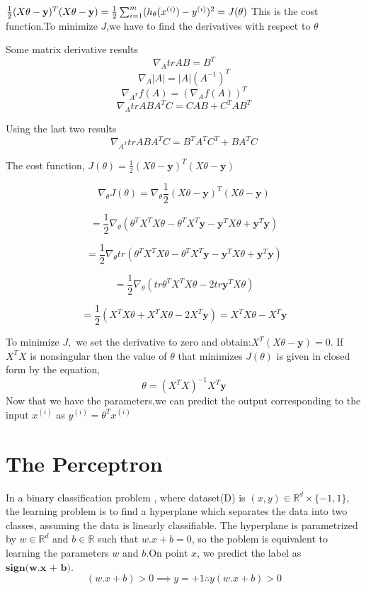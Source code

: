\documentclass[12pt]{article}
\begin{document}
 
 $\frac{1}{2}(X\theta-\textbf y)^{T}(X\theta-\textbf y)=\frac{1}{2} \sum_{i=1}^{m}(h_{\theta}(x^{(i)})-y^{(i)})^{2}=J(\theta)$ This is the cost function.To minimize $J$,we have to find the derivatives with respect to $\theta$
 
 
 
 
Some matrix derivative results
 $$\nabla_{A}tr AB = B^{T}$$ 
 $$\nabla_{A}\vert A\vert=\vert A\vert(A^{-1})^{T}$$ 
 $$\nabla_{A^{T}}f(A)= (\nabla_{A}f(A))^{T}$$ 
 $$\nabla_{A}trABA^{T}C=CAB+C^{T}AB^{T}$$
 
 
 Using the last two results 
 $$\nabla_{A^{T}}trABA^{T}C=B^{T}A^{T}C^{T}+BA^{T}C$$
 
 
 
 The cost function,  $J(\theta)=\frac{1}{2}(X\theta-\textbf{y})^{T}(X\theta-\textbf{y})$
 
 
$$ \nabla_{\theta} J(\theta)  =\nabla_{\theta}\frac{1}{2}(X\theta-\textbf{y})^{T}(X\theta-\textbf{y}) $$
 
 
 
  $$=\frac{1}{2}\nabla_{\theta}(\theta^{T}X^{T}X\theta-\theta^{T}X^{T}\textbf{y}-\textbf{y}^{T}X\theta+\textbf{y}^{T}\textbf{y}) $$
 
 
 
$$ =\frac{1}{2}\nabla_{\theta} tr(\theta^{T}X^{T}X\theta-\theta^{T}X^{T}\textbf{y}-\textbf{y}^{T}X\theta+\textbf{y}^{T}\textbf{y}) $$
 
 
 
 
$$=\frac{1}{2}\nabla_{\theta}(tr \theta^{T}X^{T}X\theta-2tr\textbf{y}^{T}X\theta)  $$
 
 

$$=\frac{1}{2}(X^{T}X\theta+X^{T}X\theta-2X^{T}\textbf{y})  =X^{T}X\theta-X^{T}\textbf{y} $$







To minimize $J,$ we set the derivative to zero and obtain:$X^{T}(X\theta-\textbf{y})=0$. If $X^{T}X$ is nonsingular then the value of $\theta $ that minimizes $J(\theta)$ is given in closed form by the equation,
$$\theta=(X^{T}X)^{-1}X^{T}\textbf{y}$$
Now that we have the parameters,we can predict the output corresponding to the input $x^{(i)}$ as $y^{(i)}=\theta^{T}x^{(i)}$



\section*{The Perceptron}
In a binary classification problem , where dataset(D) is  $(x,y) \in \mathbb{R}^{d} \times\{-1,1\}$, the  learning problem is to find a hyperplane which separates the data into two classes, 
 assuming the data is linearly classifiable. The hyperplane is parametrized by $w\in\mathbb{R}^{d}$ and $ b \in \mathbb{R}$ such that $w.x + b = 0 $, so the poblem is equivalent to learning  the parameters $w$ and $b$.On point $x$, we predict the label as $\textbf{sign(w.x + b)}$.\\
$$(w.x + b) > 0  \implies y = +1 \therefore y(w.x + b) > 0 $$
\end{document}

